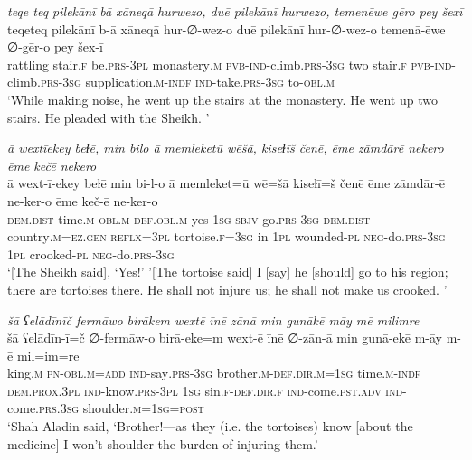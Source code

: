 \ea \label{DG.62}
\textit{teqe teq pilekānī bā xāneqā hurwezo, duē pilekānī hurwezo, temenēwe gēro pey šexī} \\ 
\gll teqeteq pilekānī b-ā xāneqā hur-∅-wez-o duē pilekānī hur-∅-wez-o temenā-ēwe ∅-gēr-o pey šex-ī \\ 
 rattling stair\textsc{\textsc{.f}} be\textsc{.prs}\textsc{-3pl} monastery\textsc{.m} \textsc{pvb-}\textsc{ind-}climb\textsc{.prs}\textsc{-3sg} two stair\textsc{\textsc{.f}} \textsc{pvb-}\textsc{ind-}climb\textsc{.prs}\textsc{-3sg} supplication\textsc{.m}\textsc{-indf} \textsc{ind-}take\textsc{.prs}\textsc{-3sg} to\textsc{-obl}\textsc{.m} \\ 
\glt `While making noise, he went up the stairs at the monastery. He went up two stairs. He pleaded with the Sheikh. '
\z 
 
\ea \label{DG.64}
\textit{ā wextīekey beɫē, min bilo ā memleketū wēšā, kiseɫīš čenē, ēme zāmdārē nekero ēme kečē nekero} \\ 
\gll ā wext-ī-ekey beɫē min bi-l-o ā memleket=ū wē=šā kiseɫī=š čenē ēme zāmdār-ē ne-ker-o ēme keč-ē ne-ker-o \\ 
 \textsc{dem.dist} time\textsc{.m}\textsc{-obl}\textsc{.m}\textsc{-def}\textsc{.obl}\textsc{.m} yes \textsc{1sg} \textsc{sbjv-}go\textsc{.prs}\textsc{-3sg} \textsc{dem.dist} country\textsc{.m}\textsc{=ez}\textsc{.gen} \textsc{reflx}\textsc{=3pl} tortoise\textsc{\textsc{.f}}\textsc{=3sg} in \textsc{1pl} wounded\textsc{\textsc{-pl}} \textsc{neg-}do\textsc{.prs}\textsc{-3sg} \textsc{1pl} crooked\textsc{\textsc{-pl}} \textsc{neg-}do\textsc{.prs}\textsc{-3sg} \\ 
\glt `[The Sheikh said], ‘Yes!' '[The tortoise said] I [say] he [should] go to his region; there are tortoises there. He shall not injure us; he shall not make us crooked. '
\z 
 
\ea \label{DG.67}
\textit{šā ʕelādīnīč fermāwo birākem wextē īnē zānā min gunākē māy mē milimre} \\ 
\gll šā ʕelādīn-ī=č ∅-fermāw-o birā-eke=m wext-ē īnē ∅-zān-ā min gunā-ekē m-āy m-ē mil=im=re \\ 
 king\textsc{.m} \textsc{pn}\textsc{-obl}\textsc{.m}\textsc{=add} \textsc{ind-}say\textsc{.prs}\textsc{-3sg} brother\textsc{.m}\textsc{-def}\textsc{.dir}\textsc{.m}\textsc{=1sg} time\textsc{.m}\textsc{-indf} \textsc{dem.prox}\textsc{.3pl} \textsc{ind-}know\textsc{.prs}\textsc{-3pl} \textsc{1sg} sin\textsc{\textsc{.f}}\textsc{-def}\textsc{.dir}\textsc{\textsc{.f}} \textsc{ind-}come\textsc{.pst}\textsc{.adv} \textsc{ind-}come\textsc{.prs}\textsc{.3sg} shoulder\textsc{.m}\textsc{=1sg}\textsc{=\textsc{post}} \\ 
\glt `Shah Aladin said, ‘Brother!—as they (i.e. the tortoises) know [about the medicine] I won’t shoulder the burden of injuring them.'
\z 
 
